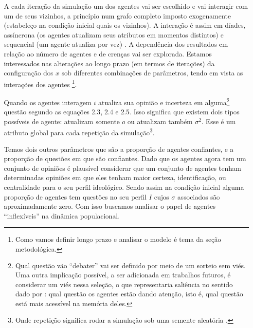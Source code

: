 A cada iteração da simulação um dos agentes vai ser escolhido e vai interagir
com um de seus vizinhos, a princípio num grafo completo imposto exogenamente
(estabeleço na condição inicial quais os vizinhos). A interação é assim em
díades, assíncrona (os agentes atualizam seus atributos em momentos distintos) e
sequencial (um agente atualiza por vez) \cite{wilensky2015introduction}. A
dependência dos resultados em relação ao número de agentes e de crenças vai ser
explorada. Estamos interessados nas alterações ao longo prazo (em termos de
iterações) da configuração dos \(x\) sob diferentes combinações de parâmetros,
tendo em vista as interações dos agentes \cite{acemoglu2011opinion}
\footnote{Como vamos definir longo prazo e analisar o modelo é tema da seção
  metodológica.}.

Quando os agentes interagem \(i\) atualiza sua opinião e incerteza em
alguma\footnote{Qual questão vão ``debater'' vai ser definido por meio de um
  sorteio sem viés. Uma outra implicação possível, a ser adicionada em trabalhos
  futuros, é considerar um viés nessa seleção, o que representaria saliência no
  sentido dado por : qual questão os agentes estão
  dando atenção, isto é, qual questão está mais acessível na memória deles.}
questão segundo as equações 2.3, 2.4 e 2.5. Isso significa que existem dois
tipos possíveis de agente: atualizam somente \(o\) ou atualizam também \(\sigma^2\).
Esse é um atributo global para cada repetição da simulação\footnote{Onde
  repetição significa rodar a simulação sob uma semente aleatória
  \cite{laver2011party}.}. 

Temos dois outros parâmetros que são a proporção de agentes confiantes, e a
proporção de questões em que são confiantes. Dado que os agentes agora tem um
conjunto de opiniões é plausível considerar que um conjunto de agentes tenham
determinadas opiniões em que eles tenham maior certeza, identificação, ou
centralidade para o seu perfil ideológico. Sendo assim na condição inicial
alguma proporção de agentes tem questões no seu perfil \(I\) cujos \(\sigma\)
associados são aproximadamente zero. Com isso buscamos analisar o papel de
agentes ``inflexíveis'' na dinâmica populacional. 

